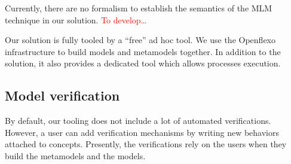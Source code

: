 

Currently, there are no formalism to establish the semantics of the MLM
technique in our solution. \textcolor{red}{To develop…}

Our solution is fully tooled by a ``free'' ad hoc tool. We use the Openflexo
infrastructure to build models and metamodels together. In addition to the
solution, it also provides a dedicated tool which allows processes execution. 

\subsection{Model verification}


By default, our tooling does not include a lot of automated verifications.
However, a user can add verification mechanisms by writing new behaviors
attached to concepts. Presently, the verifications rely on the users when they
build the metamodels and the models.
